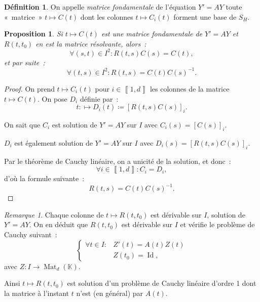 \documentclass{report}
\newtheorem{prp}[thm]{Proposition}
\theoremstyle{definition}
\newtheorem{déf}[thm]{Définition}
\theoremstyle{remark}
\newtheorem*{rmq}{Remarque}
\numberwithin{equation}{section}
\newcommand{\K}{\mathbb K}
\DeclareMathOperator{\Mat}{Mat}
\DeclareMathOperator{\Id}{Id}
\newcommand{\intint}[2]{\left\llbracket#1, #2\right\rrbracket}
\begin{document}
		\begin{déf} On appelle \textit{matrice fondamentale} de l'équation $Y' = AY$ toute «~matrice~» $t \mapsto C(t)$ dont les colonnes $t \mapsto C_i(t)$
		forment une base de $S_H$.
		\end{déf}

		\begin{prp} Si $t \mapsto C(t)$ est une matrice fondamentale de $Y' = AY$ et $R(t, t_0)$ en est la matrice résolvante, alors~:
		\begin{equation}
			\forall (s, t) \in I^2 : R(t, s)C(s) = C(t),
		\end{equation}
		et par suite~:
		\begin{equation}
			\forall (t, s) \in I^2 : R(t, s) = C(t)C(s)^{-1}.
		\end{equation}
		\end{prp}

		\begin{proof} On prend $t \mapsto C_i(t)$ pour $i \in \intint 1d$ les colonnes de la matrice $t \mapsto C(t)$. On pose $D_i$ définie par~:
		\begin{equation}
			t : \mapsto D_i(t) \coloneqq \left[R(t, s)C(s)\right]_i.
		\end{equation}

		On sait que $C_i$ est solution de $Y' = AY$ sur $I$ avec $C_i(s) = [C(s)]_i$.

		$D_i$ est également solution de $Y' = AY$ sur $I$ avec $D_i(s) = [R(t, s)C(s)]_i$.

		Par le théorème de Cauchy linéaire, on a unicité de la solution, et donc~:
		\begin{equation}
			\forall i \in \intint 1d : C_i = D_i,
		\end{equation}
		d'où la formule suivante~:
		\begin{equation}
			R(t, s) = C(t)C(s)^{-1}.
		\end{equation}
		\end{proof}

		\begin{rmq} Chaque colonne de $t \mapsto R(t, t_0)$ est dérivable sur $I$, solution de $Y'=AY$. On en déduit que $R(t, t_0)$ est dérivable sur $I$
		et vérifie le problème de Cauchy suivant~:
		\begin{equation}
			\begin{cases}
			\forall t \in I : &Z'(t) = A(t)Z(t) \\
			&Z(t_0) = \Id,
		\end{cases}
		\end{equation}
		avec $Z : I \to \Mat_d(\K)$.

		Ainsi $t \mapsto R(t, t_0)$ est solution d'un problème de Cauchy linéaire d'ordre 1 dont la matrice à l'instant $t$ n'est (en général) par $A(t)$.
		\end{rmq}
\end{document}
